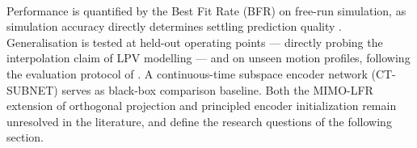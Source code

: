 \\

Performance is quantified by the Best Fit Rate (BFR) on free-run simulation, as simulation accuracy directly determines settling prediction quality \cite{schoukensljung2019nonlinear}.
Generalisation is tested at held-out operating points — directly probing the interpolation claim of LPV modelling \cite{paijmans2008interpolating, bachnas2014datadrivenlpv} — and on unseen motion profiles, following the evaluation protocol of \cite{champneys2024baseline}.
A continuous-time subspace encoder network (CT-SUBNET) \cite{beintema2023ctsubnet} serves as black-box comparison baseline.
Both the MIMO-LFR extension of orthogonal projection and principled encoder initialization remain unresolved in the literature, and define the research questions of the following section.






